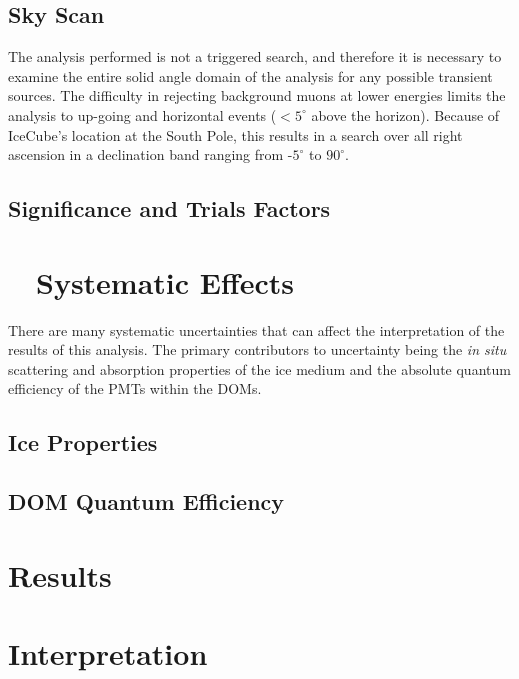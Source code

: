 \documentclass{gatech-thesis}
\begin{document}
\section{Sky Scan}

The analysis performed is not a triggered search, and therefore it is necessary to examine the entire solid angle domain of the analysis for any possible transient sources. The difficulty in rejecting background muons at lower energies limits the analysis to up-going and horizontal events ($< 5^{\circ}$ above the horizon). Because of IceCube's location at the South Pole, this results in a search over all right ascension in a declination band ranging from -$5^{\circ}$ to $90^{\circ}$.


\section{Significance and Trials Factors}


\chapter{$\quad$Systematic Effects}
There are many systematic uncertainties that can affect the interpretation of the results of this analysis. The primary contributors to uncertainty being the \textit{in situ} scattering and absorption properties of the ice medium and the absolute quantum efficiency of the PMTs within the DOMs.

\section{Ice Properties}

\section{DOM Quantum Efficiency}

\chapter{Results}

\chapter{Interpretation}
\end{document}
